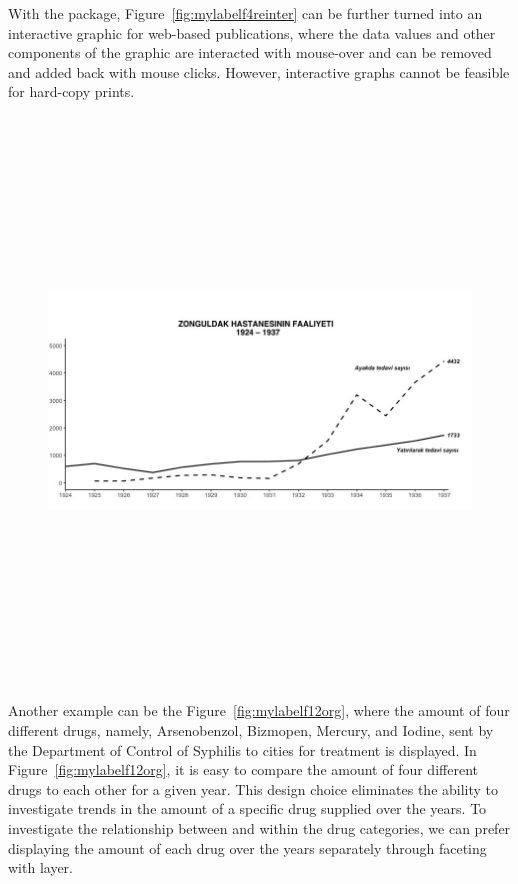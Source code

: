 With the  package, Figure~\ref{fig:mylabelf4reinter} can be further  turned into an interactive graphic for web-based publications, where the data values and other components of the graphic are interacted with mouse-over and can be removed and added back with mouse clicks. However, interactive graphs cannot be feasible for hard-copy prints.

\begin{figure}[hbt!]
	\centering
	\includegraphics[width=12cm,height=15cm,keepaspectratio]{zonguldak_reinterpreted.png}
\end{figure}


Another example can be the Figure~\ref{fig:mylabelf12org}, where the amount of four different drugs, namely, Arsenobenzol, Bizmopen, Mercury, and Iodine, sent by the Department of Control of Syphilis to cities for treatment is displayed. In Figure~\ref{fig:mylabelf12org}, it is easy to compare the amount of four different drugs to each other for a given year. This design choice eliminates  the ability to investigate trends in the amount of a specific drug supplied over the years. To investigate the relationship between and within the drug categories, we can prefer  displaying the amount of each drug over the years separately through faceting with  layer.

